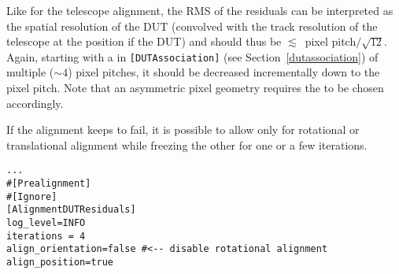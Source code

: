 Like for the telescope alignment, the RMS of the residuals can be interpreted as the spatial resolution of the DUT (convolved with the track resolution of the telescope at the position if the DUT) and should thus be $\lesssim$~pixel pitch$/\sqrt{12}$.
Again, starting with a  in \texttt{[DUTAssociation]} (see Section~\ref{dutassociation}) of multiple ($\sim4$) pixel pitches, it should be decreased incrementally down to the pixel pitch. Note that an asymmetric pixel geometry requires the  to be chosen accordingly.

If the alignment keeps to fail, it is possible to allow only for rotational or translational alignment while freezing the other for one or a few iterations.

\begin{verbatim}
...
#[Prealignment]
#[Ignore]
[AlignmentDUTResiduals]
log_level=INFO
iterations = 4
align_orientation=false #<-- disable rotational alignment
align_position=true
\end{verbatim}
